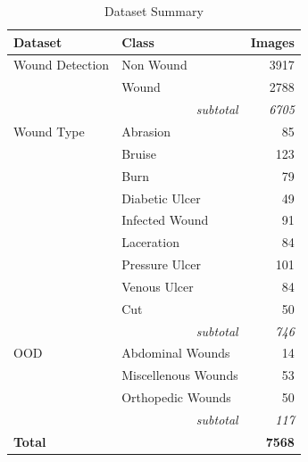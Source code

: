 \begin{table}[h]
\centering
\caption{Dataset Summary}
\label{tab:dataset}
\begin{tabular}{llr}
\hline
\textbf{Dataset} & \textbf{Class} & \textbf{Images} \\
\hline
  Wound Detection      & Non Wound                 &  3917 \\
                       & Wound                     &  2788 \\
  \multicolumn{2}{r}{\textit{subtotal}} & \textit{6705} \\
  \hline
  Wound Type           & Abrasion                  &    85 \\
                       & Bruise                    &   123 \\
                       & Burn                      &    79 \\
                       & Diabetic Ulcer            &    49 \\
                       & Infected Wound            &    91 \\
                       & Laceration                &    84 \\
                       & Pressure Ulcer            &   101 \\
                       & Venous Ulcer              &    84 \\
                       & Cut                       &    50 \\
  \multicolumn{2}{r}{\textit{subtotal}} & \textit{746} \\
  \hline
  OOD                  & Abdominal Wounds          &    14 \\
                       & Miscellenous Wounds       &    53 \\
                       & Orthopedic Wounds         &    50 \\
  \multicolumn{2}{r}{\textit{subtotal}} & \textit{117} \\
  \hline
  \textbf{Total} & & \textbf{7568} \\
  \hline
\end{tabular}
\end{table}